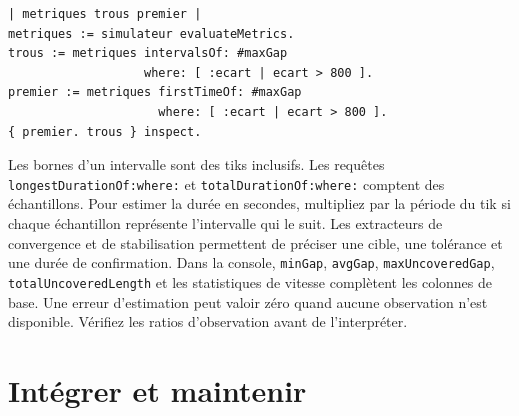 \documentclass[11pt,a4paper]{article}
\newcommand{\sel}[1]{\texttt{#1}}
\begin{document}
\begin{lstlisting}
| metriques trous premier |
metriques := simulateur evaluateMetrics.
trous := metriques intervalsOf: #maxGap
                   where: [ :ecart | ecart > 800 ].
premier := metriques firstTimeOf: #maxGap
                     where: [ :ecart | ecart > 800 ].
{ premier. trous } inspect.
\end{lstlisting}

Les bornes d'un intervalle sont des tiks inclusifs. Les requêtes \sel{longestDurationOf:where:} et \sel{totalDurationOf:where:} comptent des échantillons. Pour estimer la durée en secondes, multipliez par la période du tik si chaque échantillon représente l'intervalle qui le suit. Les extracteurs de convergence et de stabilisation permettent de préciser une cible, une tolérance et une durée de confirmation. Dans la console, \sel{minGap}, \sel{avgGap}, \sel{maxUncoveredGap}, \sel{totalUncoveredLength} et les statistiques de vitesse complètent les colonnes de base. Une erreur d'estimation peut valoir zéro quand aucune observation n'est disponible. Vérifiez les ratios d'observation avant de l'interpréter.



\clearpage
\part{Intégrer et maintenir}


\end{document}
